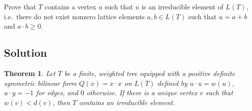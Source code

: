 \documentclass[12pt]{article}
\newtheorem{theorem}{Theorem}
\begin{document}
Prove that $T$ contains a vertex $u$ such that $u$ is an irreducible element of $L(T)$, i.e.~there do not exist nonzero lattice elements $a,b \in L(T)$ such that $u = a+b$ and $a \cdot b \ge 0$.

\subsection*{Solution}

\begin{theorem}
Let $T$ be a finite, weighted tree equipped with a positive definite symmetric bilinear form $Q(x) = x \cdot x$ on $L(T)$ defined by $u \cdot u = w(u)$, $u \cdot y = -1$ for edges, and $0$ otherwise. If there is a unique vertex $v$ such that $w(v) < d(v)$, then $T$ contains an irreducible element.
\end{theorem}
\end{document}
